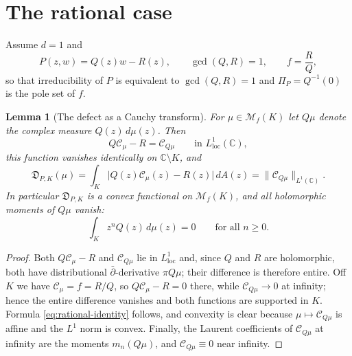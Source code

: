 \documentclass[10pt,a4paper]{amsart}
\newtheorem{lemma}[theorem]{Lemma}
\newcommand{\bC}{\mathbb C}
\newcommand{\M}{\mathcal M}
\newcommand{\Cauchy}{\mathcal C}
\begin{document}
\section{The rational case}\label{sec:rational}

Assume $d=1$ and
\[
 P(z,w)=Q(z)w-R(z),\qquad \gcd(Q,R)=1,\qquad f=\frac RQ ,
\]
so that irreducibility of $P$ is equivalent to $\gcd(Q,R)=1$ and $\Pi_P=Q^{-1}(0)$
is the pole set of $f$.

\begin{lemma}[The defect as a Cauchy transform]\label{lem:rational-identity}
For $\mu\in\M_f(K)$ let $Q\mu$ denote the complex measure $Q(z)\,d\mu(z)$.  Then
\[
 Q\Cauchy_\mu-R=\Cauchy_{Q\mu}
 \qquad\text{in }L^1_{\mathrm{loc}}(\bC),
\]
this function vanishes identically on $\bC\setminus K$, and
\begin{equation}\label{eq:rational-identity}
 \mathfrak D_{P,K}(\mu)
 =\int_K\bigl|Q(z)\Cauchy_\mu(z)-R(z)\bigr|\,dA(z)
 =\bigl\|\Cauchy_{Q\mu}\bigr\|_{L^1(\bC)} .
\end{equation}
In particular $\mathfrak D_{P,K}$ is a convex functional on $\M_f(K)$, and all
holomorphic moments of $Q\mu$ vanish:
\begin{equation}\label{eq:vanishing-moments}
 \int_Kz^{n}Q(z)\,d\mu(z)=0\qquad\text{for all }n\geq0 .
\end{equation}
\end{lemma}

\begin{proof}
Both $Q\Cauchy_\mu-R$ and $\Cauchy_{Q\mu}$ lie in $L^1_{\mathrm{loc}}$ and, since
$Q$ and $R$ are holomorphic, both have distributional $\bar\partial$-derivative
$\pi Q\mu$; their difference is therefore entire.  Off $K$ we have
$\Cauchy_\mu=f=R/Q$, so $Q\Cauchy_\mu-R=0$ there, while $\Cauchy_{Q\mu}\to0$ at
infinity; hence the entire difference vanishes and both functions are supported
in $K$.  Formula \eqref{eq:rational-identity} follows, and convexity is clear
because $\mu\mapsto\Cauchy_{Q\mu}$ is affine and the $L^1$ norm is convex.
Finally, the Laurent coefficients of $\Cauchy_{Q\mu}$ at infinity are the
moments $m_n(Q\mu)$, and $\Cauchy_{Q\mu}\equiv0$ near infinity.
\end{proof}
\end{document}
